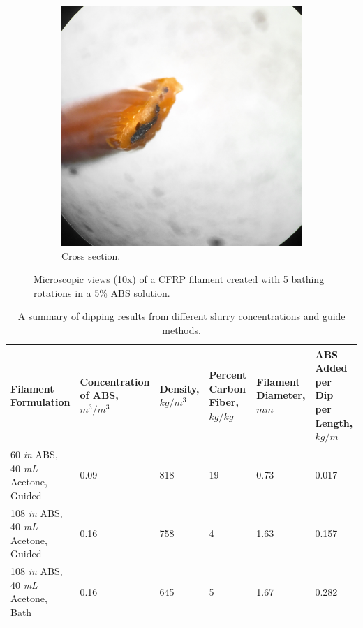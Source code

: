 \begin{figure}[h!]
\begin{subfigure}[b]{0.3\textwidth}
                \includegraphics[width=\textwidth]{./figures/filament-108-40-flat-end}
                \caption{Cross section.}
                \label{fig:filament-108-40-flat-end}
        \end{subfigure}
        \caption{Microscopic views (10x) of a CFRP filament created with 5 bathing rotations in a 5\% ABS solution.}\label{fig:filament-108-40-bath-microscope}
\end{figure}



\begin{table}[h!]
    \centering
    \begin{tabular}{p{1.5in}|p{1in}|p{0.75in}|p{0.75in}|p{0.75in}|p{0.75in}}
        Filament Formulation & Concentration of ABS, $m^3/m^3$ & Density, $kg/m^3$ & Percent Carbon Fiber, $kg/kg$ & Filament Diameter, $mm$ & ABS Added per Dip per Length, $kg/m$  \\ \hline \hline
        60 \textit{in} ABS, 40 \textit{mL} Acetone, Guided & 0.09 & 818 & 19 & 0.73 & 0.017 \\ \hline
        108 \textit{in} ABS, 40 \textit{mL} Acetone, Guided & 0.16 & 758 & 4 & 1.63 & 0.157 \\ \hline
        108 \textit{in} ABS, 40 \textit{mL} Acetone, Bath & 0.16 & 645 & 5 & 1.67 & 0.282 \\
 
    \end{tabular}
    \caption{A summary of dipping results from different slurry concentrations and guide methods.}
    \label{tab:dipping-results}
\end{table}


